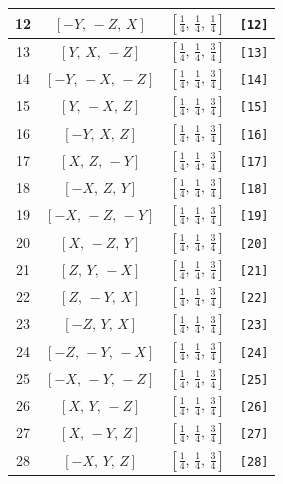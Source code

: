 \documentclass[fleqn,8pt]{jsarticle}
\begin{document}
\begin{longtable}{cccc}
12 & $\left[ - Y,\, - Z,\, X \right]$ & $\left[ \frac{1}{4},\, \frac{1}{4},\, \frac{1}{4} \right]$ & {\tt [12]} \\ \hline
13 & $\left[ Y,\, X,\, - Z \right]$ & $\left[ \frac{1}{4},\, \frac{1}{4},\, \frac{3}{4} \right]$ & {\tt [13]} \\ \hline
14 & $\left[ - Y,\, - X,\, - Z \right]$ & $\left[ \frac{1}{4},\, \frac{1}{4},\, \frac{3}{4} \right]$ & {\tt [14]} \\ \hline
15 & $\left[ Y,\, - X,\, Z \right]$ & $\left[ \frac{1}{4},\, \frac{1}{4},\, \frac{3}{4} \right]$ & {\tt [15]} \\ \hline
16 & $\left[ - Y,\, X,\, Z \right]$ & $\left[ \frac{1}{4},\, \frac{1}{4},\, \frac{3}{4} \right]$ & {\tt [16]} \\ \hline
17 & $\left[ X,\, Z,\, - Y \right]$ & $\left[ \frac{1}{4},\, \frac{1}{4},\, \frac{3}{4} \right]$ & {\tt [17]} \\ \hline
18 & $\left[ - X,\, Z,\, Y \right]$ & $\left[ \frac{1}{4},\, \frac{1}{4},\, \frac{3}{4} \right]$ & {\tt [18]} \\ \hline
19 & $\left[ - X,\, - Z,\, - Y \right]$ & $\left[ \frac{1}{4},\, \frac{1}{4},\, \frac{3}{4} \right]$ & {\tt [19]} \\ \hline
20 & $\left[ X,\, - Z,\, Y \right]$ & $\left[ \frac{1}{4},\, \frac{1}{4},\, \frac{3}{4} \right]$ & {\tt [20]} \\ \hline
21 & $\left[ Z,\, Y,\, - X \right]$ & $\left[ \frac{1}{4},\, \frac{1}{4},\, \frac{3}{4} \right]$ & {\tt [21]} \\ \hline
22 & $\left[ Z,\, - Y,\, X \right]$ & $\left[ \frac{1}{4},\, \frac{1}{4},\, \frac{3}{4} \right]$ & {\tt [22]} \\ \hline
23 & $\left[ - Z,\, Y,\, X \right]$ & $\left[ \frac{1}{4},\, \frac{1}{4},\, \frac{3}{4} \right]$ & {\tt [23]} \\ \hline
24 & $\left[ - Z,\, - Y,\, - X \right]$ & $\left[ \frac{1}{4},\, \frac{1}{4},\, \frac{3}{4} \right]$ & {\tt [24]} \\ \hline
25 & $\left[ - X,\, - Y,\, - Z \right]$ & $\left[ \frac{1}{4},\, \frac{1}{4},\, \frac{3}{4} \right]$ & {\tt [25]} \\ \hline
26 & $\left[ X,\, Y,\, - Z \right]$ & $\left[ \frac{1}{4},\, \frac{1}{4},\, \frac{3}{4} \right]$ & {\tt [26]} \\ \hline
27 & $\left[ X,\, - Y,\, Z \right]$ & $\left[ \frac{1}{4},\, \frac{1}{4},\, \frac{3}{4} \right]$ & {\tt [27]} \\ \hline
28 & $\left[ - X,\, Y,\, Z \right]$ & $\left[ \frac{1}{4},\, \frac{1}{4},\, \frac{3}{4} \right]$ & {\tt [28]} \\ \hline

\end{longtable}
\end{document}
